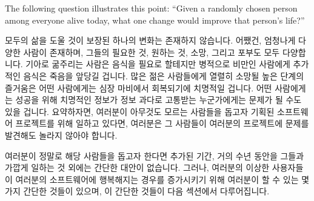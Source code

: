 The following question illustrates this point: ``Given a randomly chosen
person among everyone alive today, what one change would
improve that person's life?''

\fi

모두의 삶을 도울 것이 보장된 하나의 변화는 존재하지 않습니다.
어쨌건, 엄청나게 다양한 사람이 존재하며, 그들의 필요한 것, 원하는 것, 소망,
그리고 포부도 모두 다양합니다.
기아로 굶주리는 사람은 음식을 필요로 할테지만 병적으로 비만인 사람에게 추가적인
음식은 죽음을 앞당길 겁니다.
많은 젊은 사람들에게 열렬히 소망될 높은 단계의 즐거움은 어떤 사람에게는 심장
마비에서 회복되기에 치명적일 겁니다.
어떤 사람에게는 성공을 위해 치명적인 정보가 정보 과다로 고통받는 누군가에게는
문제가 될 수도 있을 겁니다.
요약하자면, 여러분이 아무것도 모르는 사람들을 돕고자 기획된 소프트웨어
프로젝트를 위해 일하고 있다면, 여러분은 그 사람들이 여러분의 프로젝트에 문제를
발견해도 놀라지 않아야 합니다.

여러분이 정말로 해당 사람들을 돕고자 한다면 추가된 기간, 거의 수년 동안을
그들과 가깝게 일하는 것 외에는 간단한 대안이 없습니다.
그러나, 여러분의 이상한 사용자들이 여러분의 소프트웨어에 행복해지는 경우를
증가시키기 위해 여러분이 할 수 있는 몇가지 간단한 것들이 있으며, 이 간단한
것들이 다음 섹션에서 다루어집니다.

